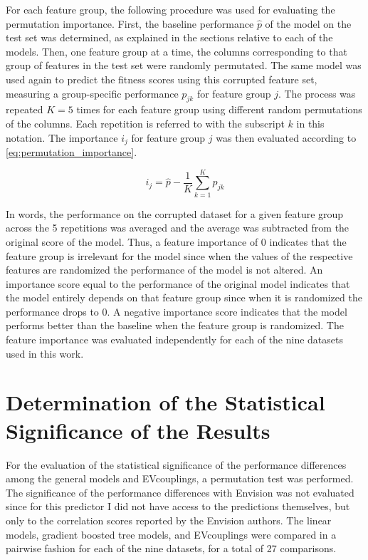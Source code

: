 For each feature group, the following procedure was used for evaluating the permutation importance.
First, the baseline performance $\hat{p}$ of the model on the test set was determined, as explained in the sections relative to each of the models.
Then, one feature group at a time, the columns corresponding to that group of features in the test set were randomly permutated.
The same model was used again to predict the fitness scores using this corrupted feature set, measuring a group-specific performance $p_{jk}$ for feature group $j$.
The process was repeated $K=5$ times for each feature group using different random permutations of the columns.
Each repetition is referred to with the subscript $k$ in this notation.
The importance $i_j$ for feature group $j$ was then evaluated according to \cref{eq:permutation_importance}.

\begin{equation}\label{eq:permutation_importance}
	i_j = \hat{p} - \frac{1}{K} \sum_{k=1}^K p_{jk}
\end{equation}

In words, the performance on the corrupted dataset for a given feature group across the \num{5} repetitions was averaged and the average was subtracted from the original score of the model.
Thus, a feature importance of \num{0} indicates that the feature group is irrelevant for the model since when the values of the respective features are randomized the performance of the model is not altered.
An importance score equal to the performance of the original model indicates that the model entirely depends on that feature group since when it is randomized the performance drops to \num{0}.
A negative importance score indicates that the model performs better than the baseline when the feature group is randomized.
The feature importance was evaluated independently for each of the nine datasets used in this work.

\section{Determination of the Statistical Significance of the Results}\label{mm:significance}
For the evaluation of the statistical significance of the performance differences among the general models and EVcouplings, a permutation test was performed.
The significance of the performance differences with Envision was not evaluated since for this predictor I did not have access to the predictions themselves, but only to the correlation scores reported by the Envision authors.
The linear models, gradient boosted tree models, and EVcouplings were compared in a pairwise fashion for each of the nine datasets, for a total of \num{27} comparisons.

